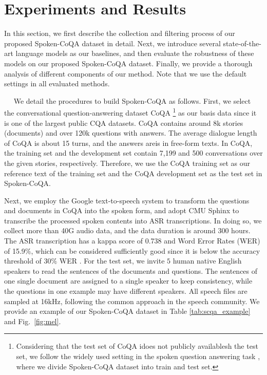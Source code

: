 \documentclass[11pt]{article}
\newcommand{\myparagraph}[1]{\vspace{2pt}\noindent{\bf{#1}}~~}
\begin{document}
\section{Experiments and Results}
\vspace{-0.5em}
In this section, we first describe the collection and filtering process of our proposed Spoken-CoQA dataset in detail. Next, we introduce several state-of-the-art language models as our baselines, and then evaluate the robustness of these models on our proposed Spoken-CoQA dataset. Finally, we provide a thorough analysis of different components of our method. Note that we use the default settings in all evaluated methods.



\myparagraph{Data Collection.}
\label{subsec:data}
We detail the procedures to build Spoken-CoQA as follows.  First, we select the conversational question-answering dataset CoQA \cite{reddy2019coqa}\footnote{Considering that the test set of CoQA \cite{reddy2019coqa} idoes not publicly availablesh the test set, we follow the widely used setting in the spoken question answering task \cite{li2018spoken}, where we divide Spoken-CoQA dataset into train and test set.} as our basis data since it is one of the largest public CQA datasets. CoQA contains around 8k stories (documents) and over 120k questions with answers. The average dialogue length of CoQA is about 15 turns, and the answers areis in free-form texts. In CoQA, the training set and the development set contain 7,199 and 500 conversations over the given stories, respectively. Therefore, we use the CoQA training set as our reference text of the training set and the CoQA development set as the test set in Spoken-CoQA.

Next, we employ the Google text-to-speech system to transform the questions and documents in CoQA into the spoken form, and adopt CMU Sphinx to transcribe the processed spoken contents into ASR transcriptions. In doing so, we collect more than 40G audio data, and the data duration is around 300 hours. The ASR transcription has a kappa score of 0.738 and Word Error Rates (WER) of 15.9$\%$, which can be considered sufficiently good since it is below the accuracy threshold of 30$\%$ WER \cite{gaur2016effects}. For the test set, we invite $5$ human native English speakers to read the sentences of the documents and questions. The sentences of one single document are assigned to a single speaker to keep consistency, while the questions in one example may have different speakers. All speech files are sampled at 16kHz, following the common approach in the speech community. We provide an example of our Spoken-CoQA dataset in Table \ref{tab:scqa_example} and Fig.~\ref{fig:mel}.
\end{document}
